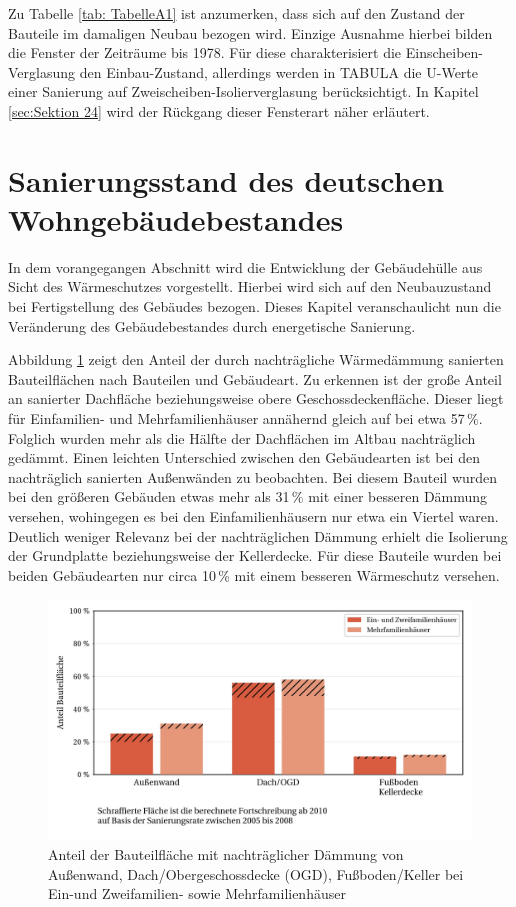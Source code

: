 Zu Tabelle \ref{tab: TabelleA1} ist anzumerken, dass sich auf den Zustand der Bauteile im damaligen Neubau bezogen wird. 
Einzige Ausnahme hierbei bilden die Fenster der Zeiträume bis 1978. 
Für diese charakterisiert die Einscheiben-Verglasung den Einbau-Zustand, allerdings werden in TABULA die U-Werte einer Sanierung auf Zweischeiben-Isolierverglasung berücksichtigt.
In Kapitel \ref{sec:Sektion 24} wird der Rückgang dieser Fensterart näher erläutert.


\section{Sanierungsstand des deutschen Wohngebäudebestandes}
\label{sec:Sektion 23}

In dem vorangegangen Abschnitt wird die Entwicklung der Gebäudehülle aus Sicht des Wärmeschutzes vorgestellt. 
Hierbei wird sich auf den Neubauzustand bei Fertigstellung des Gebäudes bezogen.
Dieses Kapitel veranschaulicht nun die Veränderung des Gebäudebestandes durch energetische Sanierung.

Abbildung \ref{fig: Abbildung231} zeigt den Anteil der durch nachträgliche Wärmedämmung sanierten Bauteilflächen nach Bauteilen und Gebäudeart.
Zu erkennen ist der große Anteil an sanierter Dachfläche beziehungsweise obere Geschossdeckenfläche.
Dieser liegt für Einfamilien- und Mehrfamilienhäuser annähernd gleich auf bei etwa 57\,\%.
Folglich wurden mehr als die Hälfte der Dachflächen im Altbau nachträglich gedämmt.
Einen leichten Unterschied zwischen den Gebäudearten ist bei den nachträglich sanierten Außenwänden zu beobachten. 
Bei diesem Bauteil wurden bei den größeren Gebäuden etwas mehr als 31\,\% mit einer besseren Dämmung versehen, wohingegen es bei den Einfamilienhäusern nur etwa ein Viertel waren.
Deutlich weniger Relevanz bei der nachträglichen Dämmung erhielt die Isolierung der Grundplatte beziehungsweise der Kellerdecke. 
Für diese Bauteile wurden bei beiden Gebäudearten nur circa 10\,\% mit einem besseren Wärmeschutz versehen. 

\begin{figure}[h]\centering
	\centering
		\includegraphics{Pictures/NachtraeglicheSanierung.jpg}
	\caption{Anteil der Bauteilfläche mit nachträglicher Dämmung von Außenwand, Dach/Obergeschossdecke (OGD), Fußboden/Keller bei Ein-und Zweifamilien- sowie Mehrfamilienhäuser \cite{Bigalke.2016}}
	\label{fig: Abbildung231} 
\end{figure}

